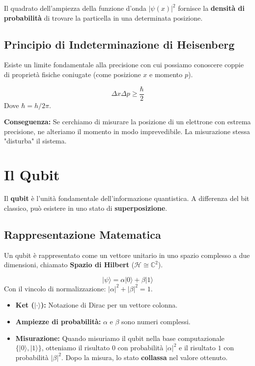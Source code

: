 \documentclass[12pt, a4paper]{article}
\begin{document}
Il quadrato dell'ampiezza della funzione d'onda $|\psi(x)|^2$ fornisce la \textbf{densità di probabilità} di trovare la particella in una determinata posizione.

\subsection{Principio di Indeterminazione di Heisenberg}
Esiste un limite fondamentale alla precisione con cui possiamo conoscere coppie di proprietà fisiche coniugate (come posizione $x$ e momento $p$).

\begin{tcolorbox}[title=Principio di Indeterminazione]
\[
\Delta x \Delta p \ge \frac{\hbar}{2}
\]
Dove $\hbar = h / 2\pi$.
\end{tcolorbox}

\textbf{Conseguenza:} Se cerchiamo di misurare la posizione di un elettrone con estrema precisione, ne alteriamo il momento in modo imprevedibile. La misurazione stessa "disturba" il sistema.

\section{Il Qubit}
Il \textbf{qubit} è l'unità fondamentale dell'informazione quantistica. A differenza del bit classico, può esistere in uno stato di \textbf{superposizione}.

\subsection{Rappresentazione Matematica}
Un qubit è rappresentato come un vettore unitario in uno spazio complesso a due dimensioni, chiamato \textbf{Spazio di Hilbert} ($\mathcal{H} \cong \mathbb{C}^2$).

\begin{tcolorbox}[title=Stato del Qubit]
\[
|\psi\rangle = \alpha|0\rangle + \beta|1\rangle
\]
Con il vincolo di normalizzazione: $|\alpha|^2 + |\beta|^2 = 1$.
\end{tcolorbox}

\begin{itemize}
    \item \textbf{Ket ($|\cdot\rangle$):} Notazione di Dirac per un vettore colonna.
    \item \textbf{Ampiezze di probabilità:} $\alpha$ e $\beta$ sono numeri complessi.
    \item \textbf{Misurazione:} Quando misuriamo il qubit nella base computazionale $\{|0\rangle, |1\rangle\}$, otteniamo il risultato $0$ con probabilità $|\alpha|^2$ e il risultato $1$ con probabilità $|\beta|^2$. Dopo la misura, lo stato \textbf{collassa} nel valore ottenuto.
\end{itemize}
\end{document}
